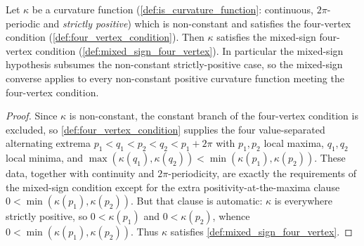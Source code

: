\begin{lemma}

  \label{lem:mixed_sign_four_vertex_of_is_curvature_function}
  Let $\kappa$ be a curvature function (\cref{def:is_curvature_function}: continuous,
  $2\pi$-periodic and \emph{strictly positive}) which is non-constant and satisfies
  the four-vertex condition (\cref{def:four_vertex_condition}). Then $\kappa$
  satisfies the mixed-sign four-vertex condition
  (\cref{def:mixed_sign_four_vertex}). In particular the mixed-sign hypothesis
  subsumes the non-constant strictly-positive case, so the mixed-sign converse
  applies to every non-constant positive curvature function meeting the four-vertex
  condition.
\end{lemma}
\begin{proof}
  \leanok
  Since $\kappa$ is non-constant, the constant branch of the four-vertex condition
  is excluded, so \cref{def:four_vertex_condition} supplies the four
  value-separated alternating extrema $p_1<q_1<p_2<q_2<p_1+2\pi$ with $p_1,p_2$
  local maxima, $q_1,q_2$ local minima, and
  $\max(\kappa(q_1),\kappa(q_2))<\min(\kappa(p_1),\kappa(p_2))$. These data, together
  with continuity and $2\pi$-periodicity, are exactly the requirements of the
  mixed-sign condition except for the extra positivity-at-the-maxima clause
  $0<\min(\kappa(p_1),\kappa(p_2))$. But that clause is automatic: $\kappa$ is
  everywhere strictly positive, so $0<\kappa(p_1)$ and $0<\kappa(p_2)$, whence
  $0<\min(\kappa(p_1),\kappa(p_2))$. Thus $\kappa$ satisfies
  \cref{def:mixed_sign_four_vertex}.
\end{proof}

